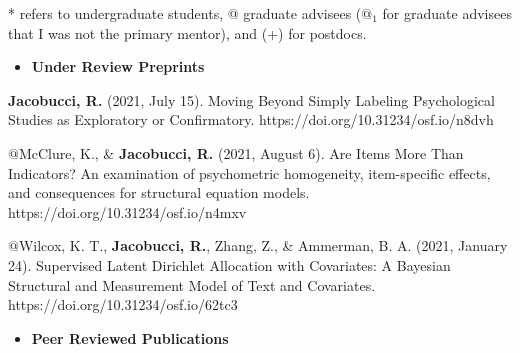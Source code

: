 \documentclass[letterpaper,10pt]{article}
\begin{document}
* refers to undergraduate students, @ graduate advisees ($@_{1}$ for graduate advisees that I was not the primary mentor), and (+) for postdocs.
\begin{itemize} 
	\setlength{\topsep}{0pt}%
	\setlength{\leftmargin}{0.1in}%
	\setlength{\listparindent}{-0.1in}%
	\setlength{\itemindent}{-0.2in}%
	\setlength{\parsep}{\parskip}%
	
	\item {\textbf{\large{Under Review Preprints}}}
\end{itemize}
\begin{etaremune}
\item \textbf{Jacobucci, R.} (2021, July 15). Moving Beyond Simply Labeling Psychological Studies as Exploratory or Confirmatory. https://doi.org/10.31234/osf.io/n8dvh

\item $@$McClure, K., \& \textbf{Jacobucci, R.} (2021, August 6). Are Items More Than Indicators? An examination of psychometric homogeneity, item-specific effects, and consequences for structural equation models. https://doi.org/10.31234/osf.io/n4mxv

\item $@$Wilcox, K. T., \textbf{Jacobucci, R.}, Zhang, Z., \& Ammerman, B. A. (2021, January 24). Supervised Latent Dirichlet Allocation with Covariates: A Bayesian Structural and Measurement Model of Text and Covariates. https://doi.org/10.31234/osf.io/62tc3

	
	\end{etaremune}
\vspace{3mm}
\begin{itemize}
	\item {\textbf{\large{Peer Reviewed Publications}}}
\end{itemize}
\end{document}
